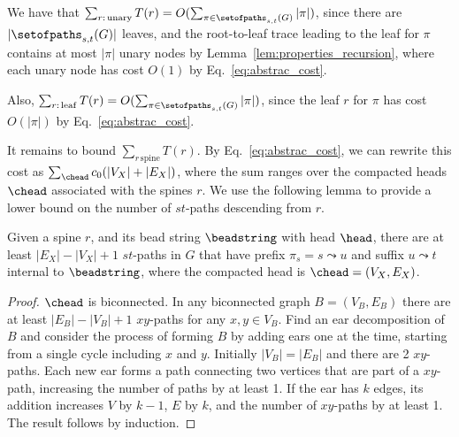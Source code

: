 We have that $\sum_{r:\,\mathrm{unary}} T(r) = O(\sum_{\pi \in
  \setofpaths_{s,t}(G)}{|\pi|})$, since there are
$|\setofpaths_{s,t}(G)|$ leaves, and the root-to-leaf trace leading to
the leaf for $\pi$ contains at most $|\pi|$ unary nodes by
Lemma~\ref{lem:properties_recursion}, where each unary node has cost
$O(1)$ by Eq.~\eqref{eq:abstrac_cost}.

Also, $\sum_{r:\,\mathrm{leaf}} T(r) = O(\sum_{\pi \in
  \setofpaths_{s,t}(G)}{|\pi|})$, since the leaf $r$ for $\pi$ has cost
$O(|\pi|)$ by Eq.~\eqref{eq:abstrac_cost}.

It remains to bound $\sum_{r\,\mathrm{spine}} T(r)$. By
Eq.~\eqref{eq:abstrac_cost}, we can rewrite this cost as
$\sum_{\chead} c_0 (|V_X| + |E_X|)$, where the sum ranges over the
compacted heads $\chead$ associated with the spines $r$. We use the
following lemma to provide a lower bound on the number of $st$-paths
descending from $r$.

\begin{lemma}
  \label{lemma:lower_bound_paths_beadstring}
  Given a spine $r$, and its bead string $\beadstring$ with head
  $\head$, there are at least $|E_X| - |V_X| + 1$ $st$-paths in $G$
  that have prefix $\pi_s = s \leadsto u$ and suffix $u \leadsto t$
  internal to $\beadstring$, where the compacted head is $\chead =
  (V_X, E_X)$.
\end{lemma}
\begin{proof}
   $\chead$ is biconnected. In any biconnected graph $B = (V_B, E_B)$
   there are at least $|E_B| - |V_B| + 1$ $xy$-paths for any $x,y \in
   V_B$. Find an ear decomposition \cite{Diestel} of $B$ and consider
   the process of forming $B$ by adding ears one at the time, starting
   from a single cycle including $x$ and $y$. Initially 
   $|V_B|=|E_B|$ and there are 2 $xy$-paths. Each new ear forms a path
   connecting two vertices that are part of a $xy$-path, increasing
   the number of paths by at least 1. If the ear has $k$ edges, its
   addition increases $V$ by $k-1$, $E$ by $k$, and the number of
   $xy$-paths by at least 1. The result follows by induction.
\end{proof}

